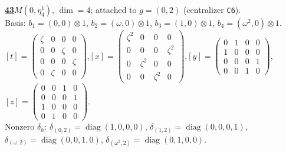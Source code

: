 \begin{samepage}\noindent\textbf{\underline{43}}\quad $M(0,\eta^{1}_{4})$, $\dim=4$; attached to $g=(0,2)$ (centralizer \texttt{C6}).\\
Basis: $b_{1}=(0,0)\otimes 1$, $b_{2}=(\omega,0)\otimes 1$, $b_{3}=(1,0)\otimes 1$, $b_{4}=(\omega^2,0)\otimes 1$.\\
$[t]=\left(\begin{smallmatrix} \zeta & 0 & 0 & 0 \\ 0 & 0 & \zeta & 0 \\ 0 & 0 & 0 & \zeta \\ 0 & \zeta & 0 & 0 \end{smallmatrix}\right)$,\quad $[x]=\left(\begin{smallmatrix} \zeta^2 & 0 & 0 & 0 \\ 0 & 0 & 0 & \zeta^2 \\ 0 & \zeta^2 & 0 & 0 \\ 0 & 0 & \zeta^2 & 0 \end{smallmatrix}\right)$,\quad $[y]=\left(\begin{smallmatrix} 0 & 1 & 0 & 0 \\ 1 & 0 & 0 & 0 \\ 0 & 0 & 0 & 1 \\ 0 & 0 & 1 & 0 \end{smallmatrix}\right)$,\quad $[z]=\left(\begin{smallmatrix} 0 & 0 & 1 & 0 \\ 0 & 0 & 0 & 1 \\ 1 & 0 & 0 & 0 \\ 0 & 1 & 0 & 0 \end{smallmatrix}\right)$.\\
Nonzero $\delta_h$: $\delta_{(0,2)}=\operatorname{diag}(1,0,0,0)$, $\delta_{(1,2)}=\operatorname{diag}(0,0,0,1)$, $\delta_{(\omega,2)}=\operatorname{diag}(0,0,1,0)$, $\delta_{(\omega^2,2)}=\operatorname{diag}(0,1,0,0)$.\end{samepage}
\medskip

